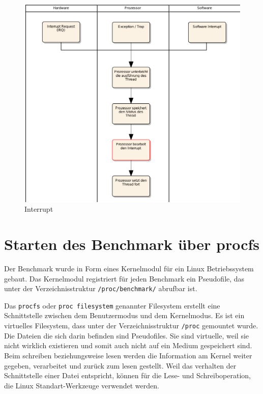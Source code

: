 \begin{figure}[H]
\centering
\includegraphics[width=1.0\textwidth]{images/interrupt_ea.pdf}
\caption{Interrupt}
\label{fig:Interrupt}
\end{figure}

\section{Starten des Benchmark über procfs}

Der Benchmark wurde in Form eines Kernelmodul für ein Linux Betriebssystem gebaut. Das Kernelmodul registriert für jeden Benchmark ein Pseudofile, das unter der Verzeichnisstruktur \texttt{/proc/benchmark/} abrufbar ist.
\par
Das \texttt{procfs} oder \texttt{proc filesystem} genannter Filesystem erstellt eine Schnittstelle zwischen dem Benutzermodus und dem Kernelmodus. Es ist ein virtuelles Filesystem, dass unter der Verzeichnisstruktur \texttt{/proc} gemountet wurde\cite{mauerer2010professional}. Die Dateien die sich darin befinden sind Pseudofiles. Sie sind virtuelle, weil sie nicht wirklich existieren und somit auch nicht auf ein Medium gespeichert sind. Beim schreiben beziehungsweise lesen werden die Information am Kernel weiter gegeben, verarbeitet und zurück zum lesen gestellt. Weil das verhalten der Schnittstelle einer Datei entspricht, können für die Lese- und Schreiboperation, die Linux Standart-Werkzeuge verwendet werden.


